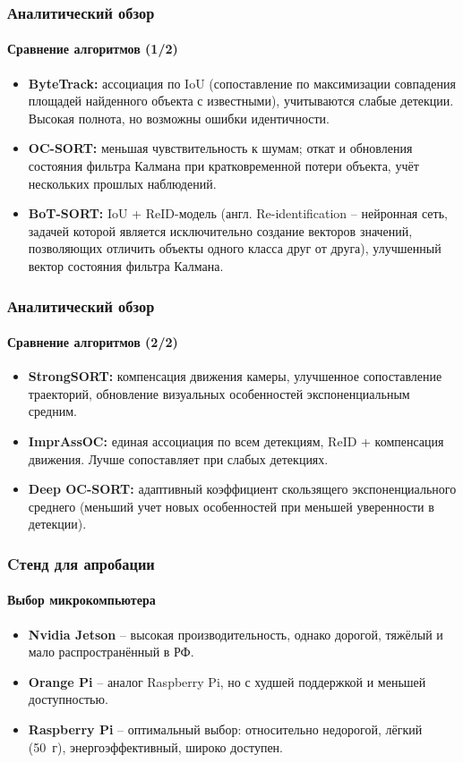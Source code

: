 \documentclass{beamer} %
\begin{document}
\begin{frame}
  \frametitle{Аналитический обзор}
  \framesubtitle{Сравнение алгоритмов (1/2)}
  \begin{itemize}
    \item \textbf{ByteTrack:} ассоциация по IoU (сопоставление по максимизации совпадения площадей найденного объекта с известными), учитываются слабые детекции. Высокая полнота, но возможны ошибки идентичности.
    \item \textbf{OC-SORT:} меньшая чувствительность к шумам; откат и обновления состояния фильтра Калмана при кратковременной потери объекта, учёт нескольких прошлых наблюдений.
    \item \textbf{BoT-SORT:} IoU + ReID-модель (англ. Re-identification -- нейронная сеть, задачей которой
    является исключительно создание векторов значений, позволяющих отличить объекты одного класса друг от друга), улучшенный вектор состояния фильтра Калмана.
  \end{itemize}
\end{frame}
\begin{frame}
  \frametitle{Аналитический обзор}
  \framesubtitle{Сравнение алгоритмов (2/2)}
  \begin{itemize}
    \item \textbf{StrongSORT:} компенсация движения камеры, улучшенное сопоставление траекторий, обновление визуальных особенностей экспоненциальным средним.
    \item \textbf{ImprAssOC:} единая ассоциация по всем детекциям, ReID + компенсация движения. Лучше сопоставляет при слабых детекциях.
    \item \textbf{Deep OC-SORT:} адаптивный коэффициент скользящего экспоненциального среднего (меньший учет новых особенностей при меньшей уверенности в детекции).
  \end{itemize}
\end{frame}

\begin{frame}
  \frametitle{Cтенд для апробации}
  \framesubtitle{Выбор микрокомпьютера}
  \begin{itemize}
      \item \textbf{Nvidia Jetson} – высокая производительность, однако дорогой, тяжёлый и мало распространённый в РФ.
      \item \textbf{Orange Pi} – аналог Raspberry Pi, но с худшей поддержкой и меньшей доступностью.
      \item \textbf{Raspberry Pi} – оптимальный выбор: относительно недорогой, лёгкий (50 г), энергоэффективный, широко доступен.
  \end{itemize}
\end{frame}
\end{document}
